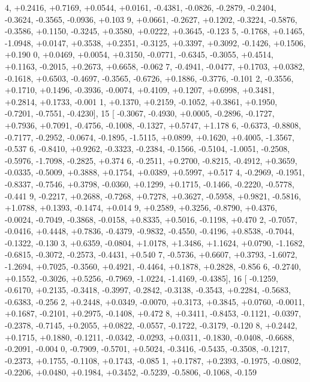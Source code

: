 \begin{DoxyCode}
      4, +0.2416, +0.7169, +0.0544, +0.0161, -0.4381, -0.0826, -0.2879, -0.2404, -0.3624, -0.3565, -0.0936, +0.103
      9, +0.0661, -0.2627, +0.1202, -0.3224, -0.5876, -0.3586, +0.1150, -0.3245, +0.3580, +0.0222, +0.3645, -0.123
      5, -0.1768, +0.1465, -1.0948, +0.0147, +0.3538, +0.2351, -0.3125, +0.3397, +0.3092, -0.1426, +0.1506, +0.190
      0, +0.0469, +0.0054, +0.3150, -0.0771, -0.6345, -0.3055, +0.4514, +0.1163, -0.2015, +0.2673, +0.6658, -0.062
      7, -0.4941, -0.0477, +0.1703, +0.0382, -0.1618, +0.6503, -0.4697, -0.3565, -0.6726, +0.1886, -0.3776, -0.101
      2, -0.3556, +0.1710, +0.1496, -0.3936, -0.0074, +0.4109, +0.1207, +0.6998, +0.3481, +0.2814, +0.1733, -0.001
      1, +0.1370, +0.2159, -0.1052, +0.3861, +0.1950, -0.7201, -0.7551, -0.4230],
15 [ -0.3067, -0.4930, +0.0005, -0.2896, -0.1727, +0.7936, +0.7091, -0.4756, -0.1008, -0.1327, +0.5747, +1.178
      6, -0.6373, -0.8808, -0.7177, -0.2952, -0.0674, -0.1895, -1.5115, +0.0899, +0.1620, +0.4005, -1.3567, -0.537
      6, -0.8410, +0.9262, -0.3323, -0.2384, -0.1566, -0.5104, -1.0051, -0.2508, -0.5976, -1.7098, -0.2825, +0.374
      6, -0.2511, +0.2700, -0.8215, -0.4912, +0.3659, -0.0335, -0.5009, +0.3888, +0.1754, +0.0389, +0.5997, +0.517
      4, -0.2969, -0.1951, -0.8337, -0.7546, +0.3798, -0.0360, +0.1299, +0.1715, -0.1466, -0.2220, -0.5778, -0.441
      9, -0.2217, +0.2688, -0.7268, +0.7278, +0.3627, -0.5958, +0.9821, -0.5816, +1.0788, +0.1393, -0.1474, +0.014
      9, +0.2589, +0.3256, -0.8790, +0.4376, -0.0024, -0.7049, -0.3868, -0.0158, +0.8335, +0.5016, -0.1198, +0.470
      2, -0.7057, -0.0416, +0.4448, +0.7836, -0.4379, -0.9832, -0.4550, -0.4196, +0.8538, -0.7044, -0.1322, -0.130
      3, +0.6359, -0.0804, +1.0178, +1.3486, +1.1624, +0.0790, -1.1682, -0.6815, -0.3072, -0.2573, -0.4431, +0.540
      7, -0.5736, +0.6607, +0.3793, -1.6072, -1.2694, +0.7025, -0.3560, +0.4921, -0.4464, +0.1878, +0.2828, -0.856
      6, -0.2740, +0.1552, -0.3026, +0.5256, -0.7969, -1.0224, -1.4169, -0.4385],
16 [ -0.1259, -0.6170, +0.2135, -0.3418, -0.3997, -0.2842, -0.3138, -0.3543, +0.2284, -0.5683, -0.6383, -0.256
      2, +0.2448, +0.0349, -0.0070, +0.3173, +0.3845, +0.0760, -0.0011, +0.1687, -0.2101, +0.2975, -0.1408, +0.472
      8, +0.3411, -0.8453, -0.1121, -0.0397, -0.2378, -0.7145, +0.2055, +0.0822, -0.0557, -0.1722, -0.3179, -0.120
      8, +0.2442, +0.1715, +0.1880, -0.1211, -0.0342, -0.0293, +0.0311, -0.1830, -0.0408, -0.6688, -0.2091, -0.004
      0, -0.7909, -0.5701, +0.5024, -0.3416, -0.5435, -0.3508, -0.1217, -0.2373, +0.1755, -0.1108, +0.1743, -0.085
      1, +0.1787, +0.2393, -0.1975, -0.0802, -0.2206, +0.0480, +0.1984, +0.3452, -0.5239, -0.5806, -0.1068, -0.159

\end{DoxyCode}
